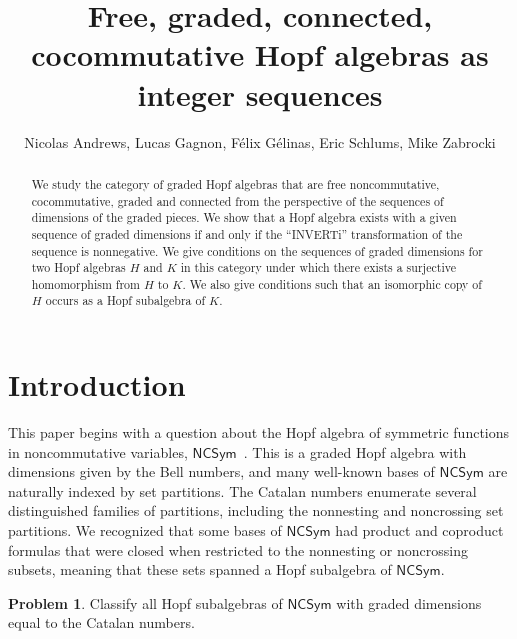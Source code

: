 \documentclass[11pt]{amsart}
\title{Free, graded, connected, cocommutative Hopf algebras as integer sequences}
\author{Nicolas Andrews, Lucas Gagnon, F\'{e}lix G\'{e}linas, Eric Schlums, Mike Zabrocki}
\theoremstyle{definition}
\newtheorem{problem}[theorem]{Problem}
\numberwithin{equation}{section}
\newcommand{\NCSym}{\mathsf{NCSym}}
\begin{document}
\maketitle
\begin{abstract}
We study the category of graded Hopf algebras that are
free noncommutative, cocommutative,
graded and connected
from the perspective of the sequences of dimensions of the graded pieces.
We show that a Hopf algebra exists with a given sequence of graded dimensions
if and only if the ``INVERTi'' transformation of the sequence is nonnegative.
We give conditions on the sequences of graded dimensions for two Hopf algebras $H$ and $K$
in this category under which there exists a surjective homomorphism from $H$ to $K$.
We also give conditions such that an isomorphic copy of
$H$ occurs as a Hopf subalgebra of $K$.
\end{abstract}

\begin{comment}
We study the category of free, graded, connected, cocommutative Hopf algebras
by what can be said from the sequence of graded dimensions.
Let $\vec{a} = (a_1, a_2, a_3, \ldots)$ be a sequence of nonnegative integers,
then a Hopf algebra $H := \bigoplus_{n\geq0} H_n$ such that 
$a_n = \dim H_n$ if and only if a transformation of $\vec{a}$ is nonnegative.
If $H$ and $K$ are graded Hopf algebras then state conditions on the dimension
sequences of $H$ and $K$...
\end{comment}

\setcounter{tocdepth}{1}
\tableofcontents

\section{Introduction}

This paper begins with a question about the Hopf algebra of symmetric functions in noncommutative variables, $\NCSym$~\cite{AgEtAl12, BHRZ05, GebSag01, HNT08, RS06, W36}.  
This is a graded Hopf algebra with dimensions given by the Bell numbers, and many well-known bases of $\NCSym$ are naturally indexed by set partitions.  
The Catalan numbers enumerate several distinguished families of partitions, including the nonnesting and noncrossing set partitions.  
We recognized that some bases of $\NCSym$ had product and coproduct formulas that were closed when restricted to the nonnesting or noncrossing subsets, meaning that these sets spanned a Hopf subalgebra of $\NCSym$.

\begin{problem}
\label{problem:motivating_calatan_question}
Classify all Hopf subalgebras of $\NCSym$ with graded dimensions equal to the Catalan numbers.
\end{problem}
\end{document}
